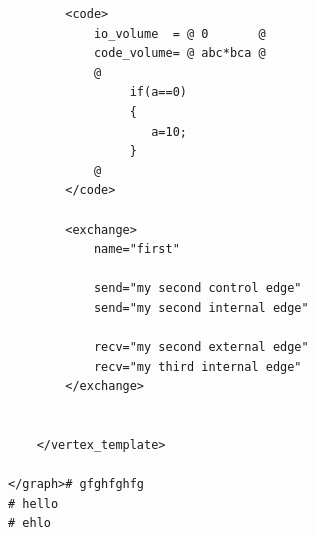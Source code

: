 \documentclass[a4paper, 12pt]{article}
\begin{document}
\begin{lstlisting}
	    <code>
	        io_volume  = @ 0       @
	        code_volume= @ abc*bca @
	        @
	             if(a==0)
	             {
	                a=10;
	             }
	        @
	    </code>
	
	    <exchange>
	        name="first"
	        
	        send="my second control edge"
	        send="my second internal edge"
	        
	        recv="my second external edge"
	        recv="my third internal edge"
	    </exchange>

		
	</vertex_template>

</graph># gfghfghfg
# hello
# ehlo
\end{lstlisting}
\end{document}
